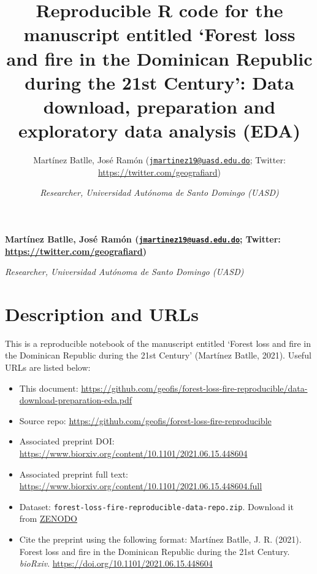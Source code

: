 \documentclass[10pt,landscape,a3paper]{article}
\title{Reproducible R code for the manuscript entitled `Forest loss and
fire in the Dominican Republic during the 21st Century': Data download,
preparation and exploratory data analysis (EDA)  }
\author{\Large Martínez Batlle, José Ramón
(\href{mailto:jmartinez19@uasd.edu.do}{\nolinkurl{jmartinez19@uasd.edu.do}};
Twitter:
\url{https://twitter.com/geografiard})\vspace{0.05in} \newline\normalsize\emph{}   \and \Large \vspace{0.05in} \newline\normalsize\emph{Researcher,
Universidad Autónoma de Santo Domingo (UASD)}  }
\date{}
\newcommand*{\authorfont}{\fontfamily{phv}\selectfont}
\begin{document}
	
%    


{%
\setlength{\parindent}{0pt}
\thispagestyle{plain}
{\fontsize{18}{20}\selectfont\raggedright 
\maketitle  %

}

{
   \vskip 13.5pt\relax \normalsize\fontsize{11}{12} 
\textbf{\authorfont Martínez Batlle, José Ramón
(\href{mailto:jmartinez19@uasd.edu.do}{\nolinkurl{jmartinez19@uasd.edu.do}};
Twitter:
\url{https://twitter.com/geografiard})} \hskip 15pt \emph{\small }   \par \textbf{\authorfont } \hskip 15pt \emph{\small Researcher,
Universidad Autónoma de Santo Domingo (UASD)}   

}

}






\vskip 6.5pt

{
\hypersetup{linkcolor=black}
\setcounter{tocdepth}{4}
\tableofcontents
}

\noindent  \hypertarget{description-and-urls}{%
\section{Description and URLs}\label{description-and-urls}}

This is a reproducible notebook of the manuscript entitled `Forest loss
and fire in the Dominican Republic during the 21st Century' (Martínez
Batlle, 2021). Useful URLs are listed below:

\begin{itemize}
\item
  This document:
  \url{https://github.com/geofis/forest-loss-fire-reproducible/data-download-preparation-eda.pdf}
\item
  Source repo:
  \url{https://github.com/geofis/forest-loss-fire-reproducible}
\item
  Associated preprint DOI:
  \url{https://www.biorxiv.org/content/10.1101/2021.06.15.448604}
\item
  Associated preprint full text:
  \url{https://www.biorxiv.org/content/10.1101/2021.06.15.448604.full}
\item
  Dataset: \texttt{forest-loss-fire-reproducible-data-repo.zip}.
  Download it from \href{https://zenodo.org/record/5681481}{ZENODO}
\item
  Cite the preprint using the following format: Martínez Batlle, J. R.
  (2021). Forest loss and fire in the Dominican Republic during the 21st
  Century. \emph{bioRxiv}.
  \url{https://doi.org/10.1101/2021.06.15.448604}
\end{itemize}
\end{document}
